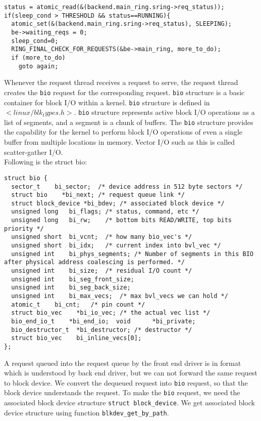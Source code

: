 \begin{verbatim}
status = atomic_read(&(backend.main_ring.sring->req_status));
if(sleep_cond > THRESHOLD && status==RUNNING){
  atomic_set(&(backend.main_ring.sring->req_status), SLEEPING);
  be->waiting_reqs = 0;
  sleep_cond=0;
  RING_FINAL_CHECK_FOR_REQUESTS(&be->main_ring, more_to_do);
  if (more_to_do)
    goto again;
\end{verbatim}

\label{subsec:createbio}
Whenever the request thread receives a request to serve, the request thread creates the \texttt{bio} request for the corresponding request. \texttt{bio} structure is a basic container for block I/O within a kernel. \texttt{bio} structure is defined in \texttt{$<linux/blk_types.h>$}. \texttt{bio} structure represents active block I/O operations as a list of segments, and a segment is a chunk of buffers. The \texttt{bio} structure provides the capability for the kernel to perform block I/O operations of even a single buffer from multiple locations in memory. Vector I/O such as this is called scatter-gather I/O.
\\
Following is the struct bio:
\begin{verbatim}
struct bio {
  sector_t    bi_sector;  /* device address in 512 byte sectors */
  struct bio    *bi_next; /* request queue link */
  struct block_device *bi_bdev; /* associated block device */
  unsigned long   bi_flags; /* status, command, etc */
  unsigned long   bi_rw;    /* bottom bits READ/WRITE, top bits priority */
  unsigned short  bi_vcnt;  /* how many bio_vec's */
  unsigned short  bi_idx;   /* current index into bvl_vec */
  unsigned int    bi_phys_segments; /* Number of segments in this BIO after physical address coalescing is performed. */
  unsigned int    bi_size;  /* residual I/O count */
  unsigned int    bi_seg_front_size;
  unsigned int    bi_seg_back_size;
  unsigned int    bi_max_vecs;  /* max bvl_vecs we can hold */
  atomic_t    bi_cnt;   /* pin count */
  struct bio_vec    *bi_io_vec; /* the actual vec list */
  bio_end_io_t    *bi_end_io;  void      *bi_private;
  bio_destructor_t  *bi_destructor; /* destructor */
  struct bio_vec    bi_inline_vecs[0];
};
\end{verbatim}
A request queued into the request queue by the front end driver is in format which is understood by back end driver, but we can not forward the same request to block device. We convert the dequeued request into \texttt{bio} request, so that the block device understands the request. To make the \texttt{bio} request, we need the associated block device structure \texttt{struct block\_device}. We get associated block device structure using function \texttt{blkdev\_get\_by\_path}.
